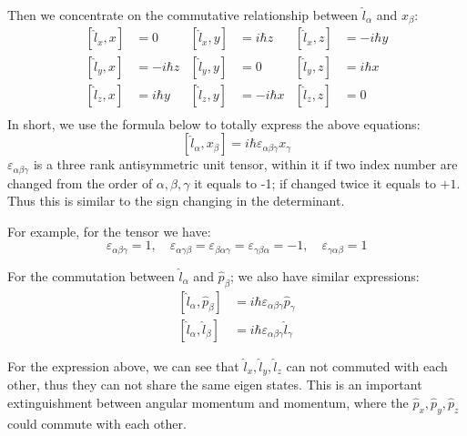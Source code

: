 Then we concentrate on the commutative relationship between
$\hat{l}_{\alpha}$ and $x_{\beta}$:
\begin{align}\label{}
[\hat{l}_{x}, x] &= 0  &  [\hat{l}_{x}, y] &= i\hbar z  &
[\hat{l}_{x}, z] &= -i\hbar y  \nonumber \\
[\hat{l}_{y}, x] &= -i\hbar z  &  [\hat{l}_{y}, y] &= 0  &
[\hat{l}_{y}, z] &=  i\hbar x  \nonumber \\
[\hat{l}_{z}, x] &= i\hbar y  &  [\hat{l}_{z}, y] &= -i\hbar x  &
[\hat{l}_{z}, z] &= 0  \nonumber \\
\end{align}
In short, we use the formula below to totally express the above
equations:
\begin{equation}\label{}
[\hat{l}_{\alpha}, x_{\beta}] =
i\hbar\varepsilon_{\alpha\beta\gamma} x_{\gamma}
\end{equation}
$\varepsilon_{\alpha\beta\gamma}$ is a three rank antisymmetric unit
tensor, within it if two index number are changed from the order of
$\alpha, \beta, \gamma$ it equals to -1; if changed twice it equals
to $+1$. Thus this is similar to the sign changing in the
determinant.

For example, for the tensor we have:
\begin{equation}\label{}
\varepsilon_{\alpha\beta\gamma} = 1, \quad
\varepsilon_{\alpha\gamma\beta} =\varepsilon_{\beta\alpha\gamma}
=\varepsilon_{\gamma\beta\alpha}= -1, \quad
\varepsilon_{\gamma\alpha\beta}= 1
\end{equation}

For the commutation between $\hat{l}_{\alpha}$ and
$\hat{p}_{\beta}$; we also have similar expressions:
\begin{align}\label{}
[\hat{l}_{\alpha}, \hat{p}_{\beta}] &=
i\hbar\varepsilon_{\alpha\beta\gamma} \hat{p}_{\gamma} \nonumber \\
[\hat{l}_{\alpha}, \hat{l}_{\beta}] &=
i\hbar\varepsilon_{\alpha\beta\gamma} \hat{l}_{\gamma}
\end{align}

For the expression above, we can see that $\hat{l}_{x}, \hat{l}_{y},
\hat{l}_{z}$ can not commuted with each other, thus they can not
share the same eigen states. This is an important extinguishment
between angular momentum and momentum, where the $\hat{p}_{x},
\hat{p}_{y}, \hat{p}_{z}$ could commute with each other.

